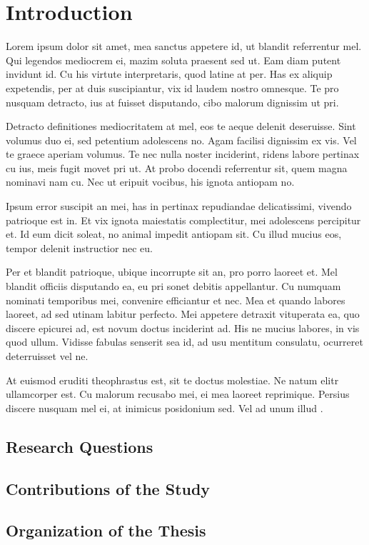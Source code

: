 \chapter{Introduction}
\label{chp:intro}


Lorem ipsum dolor sit amet, mea sanctus appetere id, ut blandit referrentur mel. Qui legendos mediocrem ei, mazim soluta praesent sed ut. Eam diam putent invidunt id. Cu his virtute interpretaris, quod latine at per. Has ex aliquip expetendis, per at duis suscipiantur, vix id laudem nostro omnesque. Te pro nusquam detracto, ius at fuisset disputando, cibo malorum dignissim ut pri.

Detracto definitiones mediocritatem at mel, eos te aeque delenit deseruisse. Sint volumus duo ei, sed petentium adolescens no. Agam facilisi dignissim ex vis. Vel te graece aperiam volumus. Te nec nulla noster inciderint, ridens labore pertinax cu ius, meis fugit movet pri ut. At probo docendi referrentur sit, quem magna nominavi nam cu. Nec ut eripuit vocibus, his ignota antiopam no.

Ipsum error suscipit an mei, has in pertinax repudiandae delicatissimi, vivendo patrioque est in. Et vix ignota maiestatis complectitur, mei adolescens percipitur et. Id eum dicit soleat, no animal impedit antiopam sit. Cu illud mucius eos, tempor delenit instructior nec eu.

Per et blandit patrioque, ubique incorrupte sit an, pro porro laoreet et. Mel blandit officiis disputando ea, eu pri sonet debitis appellantur. Cu numquam nominati temporibus mei, convenire efficiantur et nec. Mea et quando labores laoreet, ad sed utinam labitur perfecto. Mei appetere detraxit vituperata ea, quo discere epicurei ad, est novum doctus inciderint ad. His ne mucius labores, in vis quod ullum. Vidisse fabulas senserit sea id, ad usu mentitum consulatu, ocurreret deterruisset vel ne.

At euismod eruditi theophrastus est, sit te doctus molestiae. Ne natum elitr ullamcorper est. Cu malorum recusabo mei, ei mea laoreet reprimique. Persius discere nusquam mel ei, at inimicus posidonium sed. Vel ad unum illud \cite{Cohen1992}.

\section{Research Questions}


\section{Contributions of the Study}

\section{Organization of the Thesis}

